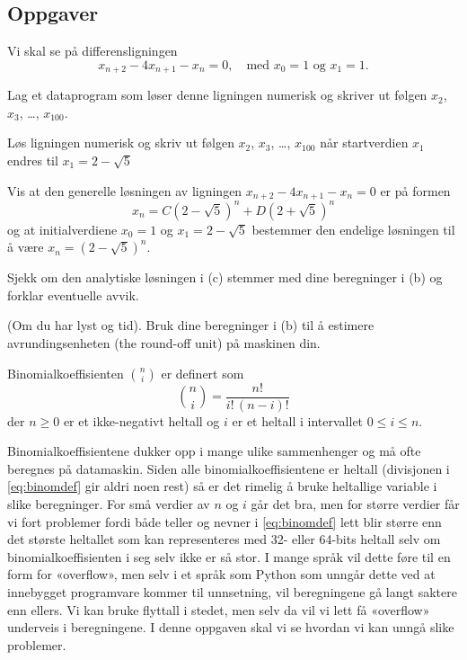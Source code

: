 \documentclass[11pt,
               a4paper,
               article,
               oneside,
               oldfontcommands,
               norsk]{memoir}
\newcounter{probnum}[section]
\newcounter{subprobnum}[probnum]
\newenvironment{oppgaver}{\vspace{12pt}\goodbreak \subsection*{Oppgaver}
\begin{list}{\bf Oppgave \arabic{probnum}.\ }
{\usecounter{probnum}\setlength{\itemsep}{6pt}}}{\end{list}\vfill\eject}
\newcommand{\oppgave}{\item}
\newenvironment{deloppgaver}{\begin{list}{\alph{subprobnum})}
{\usecounter{subprobnum}\setlength{\topsep}{3pt}
\setlength{\itemsep}{1.5pt}}}{\end{list}}
\newcommand{\deloppgave}{\item}
\begin{document}
\begin{oppgaver}

\oppgave
Vi skal se på differensligningen
\begin{equation}\label{eq:diff}
x_{n+2} - 4 x_{n+1} - x_{n} = 0,  \quad\text{med  $x_0 = 1$ og $x_1 = 1$.}
\end{equation}
\begin{deloppgaver}

\deloppgave Lag et dataprogram som løser denne ligningen numerisk og skriver ut følgen $x_2$, $x_3$, \dots, $x_{100}$. 

\deloppgave Løs ligningen numerisk og skriv ut følgen $x_2$, $x_3$, \dots, $x_{100}$ når startverdien $x_1$ endres til $x_{1} = 2-\sqrt{5}$

\deloppgave Vis at den generelle løsningen av ligningen $x_{n+2} - 4 x_{n+1} -  x_{n} = 0$ er på formen
$$
x_n = C(2-\sqrt 5)^n + D(2+\sqrt 5)^n
$$
og at initialverdiene $x_0=1$ og $x_1 = 2-\sqrt 5$ bestemmer den endelige løsningen til å være $x_n = (2-\sqrt{5})^n$.

\deloppgave Sjekk om den analytiske løsningen i (c) stemmer med dine beregninger i (b) og forklar eventuelle avvik.

\deloppgave (Om du har lyst og tid). Bruk dine beregninger i (b) til å estimere avrundingsenheten (the round-off unit) på maskinen din.
\end{deloppgaver}

\oppgave
Binomialkoeffisienten $\binom{n}{i}$ er definert som
\begin{equation}\label{eq:binomdef}
\binom{n}{i}=\frac{n!}{i!\,(n-i)!}
\end{equation}
der $n\ge 0$ er et ikke-negativt heltall og $i$ er et heltall i intervallet $0\le i \le n$.

Binomialkoeffisientene dukker opp i mange ulike sammenhenger og må ofte beregnes på datamaskin. Siden alle binomialkoeffisientene er heltall (divisjonen i  \eqref{eq:binomdef} gir aldri noen rest) så er det rimelig å bruke heltallige variable i slike beregninger. For små verdier av $n$ og $i$ går det bra, men for større verdier får vi fort problemer fordi både teller og nevner i \eqref{eq:binomdef} lett blir større enn det største heltallet som kan representeres med 32- eller 64-bits heltall selv om binomialkoeffisienten i seg selv ikke er så stor. I mange språk vil dette føre til en form for «overflow», men selv i et språk som Python som unngår dette ved at innebygget programvare kommer til unnsetning, vil beregningene gå langt saktere enn ellers. Vi kan bruke flyttall i stedet, men selv da vil vi lett få «overflow» underveis i beregningene. I denne oppgaven skal vi se hvordan vi kan unngå slike problemer.


\end{oppgaver}
\end{document}
